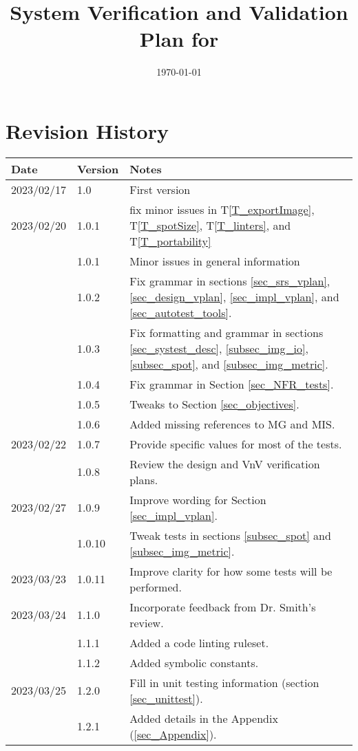 \documentclass[12pt, titlepage]{article}
\begin{document}
\title{System Verification and Validation Plan for \progname{}} 
\author{\authname}
\date{\today}
	
\maketitle


\section{Revision History}

\begin{tabularx}{\textwidth}{p{2.2cm}p{1.8cm}X}
\toprule {\bf Date} & {\bf Version} & {\bf Notes}\\
\midrule
2023/02/17 & 1.0 & First version \\
2023/02/20 & 1.0.1 & fix minor issues in T\ref{T_exportImage}, T\ref{T_spotSize}, T\ref{T_linters}, 
  and T\ref{T_portability}\\
  & 1.0.1 & Minor issues in general information\\
  & 1.0.2 & Fix grammar in sections \ref{sec_srs_vplan}, 
  \ref{sec_design_vplan}, \ref{sec_impl_vplan}, and \ref{sec_autotest_tools}. \\
  & 1.0.3 & Fix formatting and grammar in sections \ref{sec_systest_desc}, 
  \ref{subsec_img_io}, \ref{subsec_spot}, and \ref{subsec_img_metric}. \\
  & 1.0.4 & Fix grammar in Section \ref{sec_NFR_tests}. \\
  & 1.0.5 & Tweaks to Section \ref{sec_objectives}. \\
  & 1.0.6 & Added missing references to MG and MIS. \\
2023/02/22 & 1.0.7 & Provide specific values for most of the tests. \\
  & 1.0.8 & Review the design and VnV verification plans. \\
2023/02/27 & 1.0.9 & Improve wording for Section \ref{sec_impl_vplan}. \\
  & 1.0.10 & Tweak tests in sections \ref{subsec_spot} and \ref{subsec_img_metric}. \\
2023/03/23 & 1.0.11 & Improve clarity for how some tests will be performed.\\
2023/03/24 & 1.1.0 & Incorporate feedback from Dr. Smith's review.\\
  & 1.1.1 & Added a code linting ruleset.\\
  & 1.1.2 & Added symbolic constants.\\
2023/03/25 & 1.2.0 & Fill in unit testing information (section \ref{sec_unittest}). \\
  & 1.2.1 & Added details in the Appendix (\ref{sec_Appendix}). \\
\bottomrule
\end{tabularx}
\end{document}
